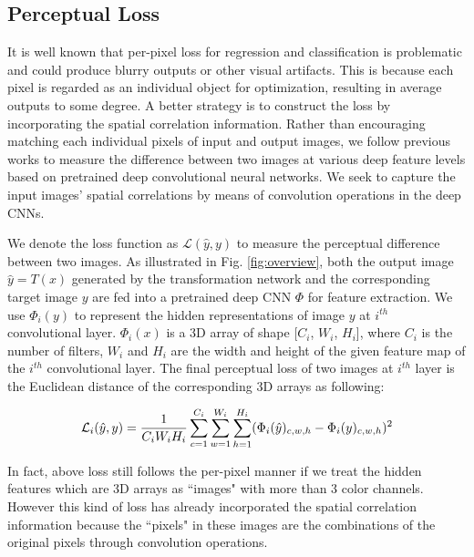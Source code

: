 \documentclass[journal]{IEEEtran}
\begin{document}
\subsection{Perceptual Loss}
It is well known that per-pixel loss for regression and classification is problematic and could produce blurry outputs or other visual artifacts. This is because each pixel is regarded as an individual object for optimization, resulting in average outputs to some degree. A better strategy is to construct the loss by incorporating the spatial correlation information. Rather than encouraging matching each individual pixels of input and output images, we follow previous works \cite{hou2017deep,johnson2016perceptual,gatys2015neural} to measure the difference between two images at various deep feature levels based on pretrained deep convolutional neural networks. We seek to capture the input images' spatial correlations by means of convolution operations in the deep CNNs.

We denote the loss function as $\mathcal{L}(\hat{y}, y)$ to measure the perceptual difference between two images. As illustrated in Fig. \ref{fig:overview}, both the output image $\hat{y} = T(x)$ generated by the transformation network and the corresponding target image $y$ are fed into a pretrained deep CNN $\Phi$ for feature extraction. We use $\Phi_i(y)$ to represent the hidden representations of image $y$ at $i^{th}$ convolutional layer. $\Phi_i(x)$ is a 3D array of shape [$C_i$, $W_i$, $H_i$], where $C_i$ is the number of filters, $W_i$ and $H_i$ are the width and height of the given feature map of the $i^{th}$ convolutional layer. The final perceptual loss of two images at $i^{th}$ layer is the Euclidean distance of the corresponding 3D arrays as following:


\begin{equation}
\footnotesize
\mathcal{L}_i(\hat{y}, y) =  \frac{1}{C_iW_iH_i}  \sum_{c=1}^{C_i}  \sum_{w=1}^{W_i}  \sum_{h=1}^{H_i} (\Phi_i(\hat{y})_{c,w,h} - \Phi_i(y)_{c,w,h})^2
\end{equation}

In fact, above loss still follows the per-pixel manner if we treat the hidden features which are 3D arrays as ``images" with more than 3 color channels. However this kind of loss has already incorporated the spatial correlation information because the ``pixels" in these images are the combinations of the original pixels through convolution operations.
\end{document}
